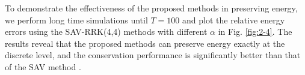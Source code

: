 \documentclass[preprint,compress,3p,10pt,fleqn]{elsarticle}
\numberwithin{equation}{section}
\begin{document}
To demonstrate the effectiveness of the proposed methods in preserving
energy, we perform long time simulations until $T=100$ and plot the
relative energy errors using the SAV-RRK(4,4) methods with different
$\alpha$ in Fig. \ref{fig:2-4}. The results reveal that the proposed methods can preserve energy exactly at the discrete level, and the
conservation performance is significantly better than that of the SAV
method \cite{chengConvergenceEnergyconservingScheme2022}.
\begin{figure}[H]
\begin{center}
\\
\end{center}
\end{figure}
\end{document}
